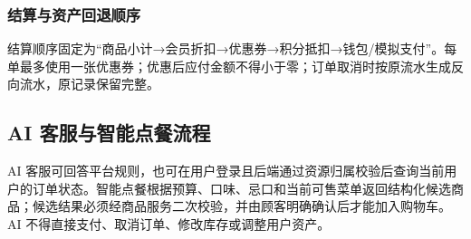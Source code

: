 \subsubsection{结算与资产回退顺序}


结算顺序固定为“商品小计→会员折扣→优惠券→积分抵扣→钱包/模拟支付”。每单最多使用一张优惠券；优惠后应付金额不得小于零；订单取消时按原流水生成反向流水，原记录保留完整。

\subsection{AI 客服与智能点餐流程}


AI 客服可回答平台规则，也可在用户登录且后端通过资源归属校验后查询当前用户的订单状态。智能点餐根据预算、口味、忌口和当前可售菜单返回结构化候选商品；候选结果必须经商品服务二次校验，并由顾客明确确认后才能加入购物车。AI 不得直接支付、取消订单、修改库存或调整用户资产。
